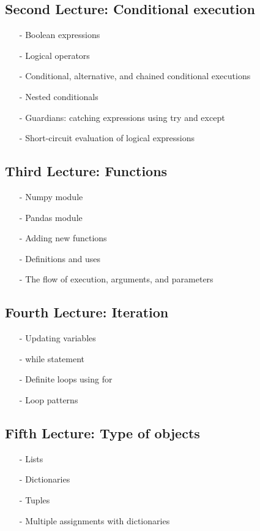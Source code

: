 \subsection*{Second Lecture: Conditional execution}
\begin{itemize}
\item[-]	Boolean expressions
\item[-]	Logical operators
\item[-]	Conditional, alternative, and chained conditional executions
\item[-]	Nested conditionals
\item[-]	Guardians: catching expressions using try and except
\item[-]	Short-circuit evaluation of logical expressions
\end{itemize}

\subsection*{Third Lecture: Functions}
\begin{itemize}
\item[-]	Numpy module
\item[-]	Pandas module
\item[-]   Adding new functions
\item[-]	Definitions and uses
\item[-]	The flow of execution, arguments, and parameters
\end{itemize}

\subsection*{Fourth Lecture: Iteration}
\begin{itemize}
\item[-]	Updating variables
\item[-]	while statement
\item[-]	Definite loops using for
\item[-]	Loop patterns
\end{itemize}

\subsection*{Fifth Lecture: Type of objects}
\begin{itemize}
\item[-]	Lists
\item[-]	Dictionaries
\item[-]	Tuples
\item[-]	Multiple assignments with dictionaries

\end{itemize}

